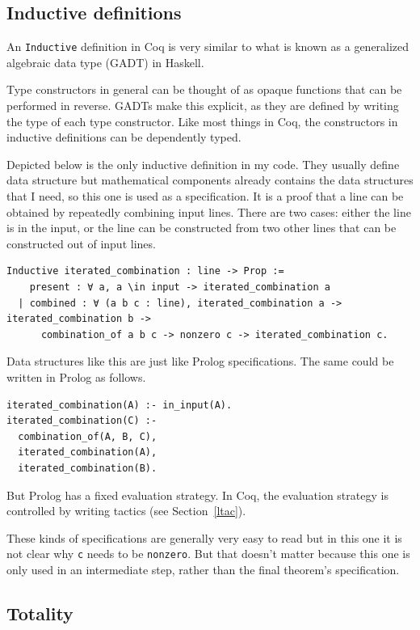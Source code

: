 \documentclass[english, 12pt, a4paper, sci, a-1b, online]{aaltothesis}
\newcommand\icoq[1]{\texttt{#1}}
\begin{document}
\subsection{Inductive definitions}

An \icoq{Inductive} definition in Coq is very similar to what is known as a generalized algebraic data type (GADT) in Haskell.

Type constructors in general can be thought of as opaque functions that can be performed in reverse. GADTs make this explicit, as they are defined by writing the type of each type constructor. Like most things in Coq, the constructors in inductive definitions can be dependently typed.

Depicted below is the only inductive definition in my code. They usually define data structure but mathematical components already contains the data structures that I need, so this one is used as a specification. It is a proof that a line can be obtained by repeatedly combining input lines. There are two cases: either the line is in the input, or the line can be constructed from two other lines that can be constructed out of input lines.

\begin{verbatim}
Inductive iterated_combination : line -> Prop :=
    present : ∀ a, a \in input -> iterated_combination a
  | combined : ∀ (a b c : line), iterated_combination a -> iterated_combination b ->
      combination_of a b c -> nonzero c -> iterated_combination c.
\end{verbatim}

Data structures like this are just like Prolog specifications. The same could be written in Prolog as follows.
\begin{verbatim}
iterated_combination(A) :- in_input(A).
iterated_combination(C) :-
  combination_of(A, B, C),
  iterated_combination(A),
  iterated_combination(B).
\end{verbatim}
But Prolog has a fixed evaluation strategy. In Coq, the evaluation strategy is controlled by writing tactics (see Section~\ref{ltac}).

These kinds of specifications are generally very easy to read but in this one it is not clear why \icoq{c} needs to be \icoq{nonzero}. But that doesn't matter because this one is only used in an intermediate step, rather than the final theorem's specification.

\subsection{Totality}\label{totality}
\end{document}
